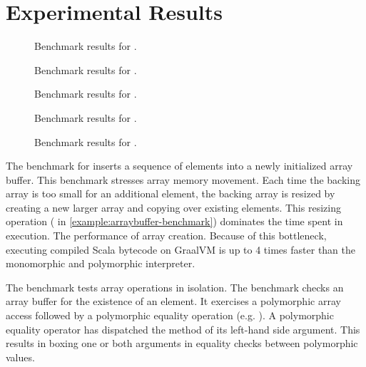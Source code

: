 \section{Experimental Results}

\begin{figure}
	\centering
	
	\caption{Benchmark results for .}
\end{figure}

\begin{figure}
	\centering
	
	\caption{Benchmark results for .}
\end{figure}

\begin{figure}
	\centering
	
	\caption{Benchmark results for .}
\end{figure}

\begin{figure}
	\centering
	
	\caption{Benchmark results for .}
\end{figure}

\begin{figure}
	\centering
	
	\caption{Benchmark results for .}
\end{figure}

The benchmark for  inserts a sequence of elements into a newly initialized array buffer. 
This benchmark stresses array memory movement.
Each time the backing array is too small for an additional element, the backing array is resized by creating a new larger array and copying over existing elements.
This resizing operation ( in \ref{example:arraybuffer-benchmark}) dominates the time spent in execution.
The performance of array creation.
Because of this bottleneck, executing compiled Scala bytecode on GraalVM is up to 4 times faster than the monomorphic and polymorphic interpreter.

The  benchmark tests array operations in isolation. 
The benchmark checks an array buffer for the existence of an element.
It exercises a polymorphic array access followed by a polymorphic equality operation (e.g. ).
A polymorphic equality operator has dispatched the  method of its left-hand side argument.
This results in boxing one or both arguments in equality checks between polymorphic values.


